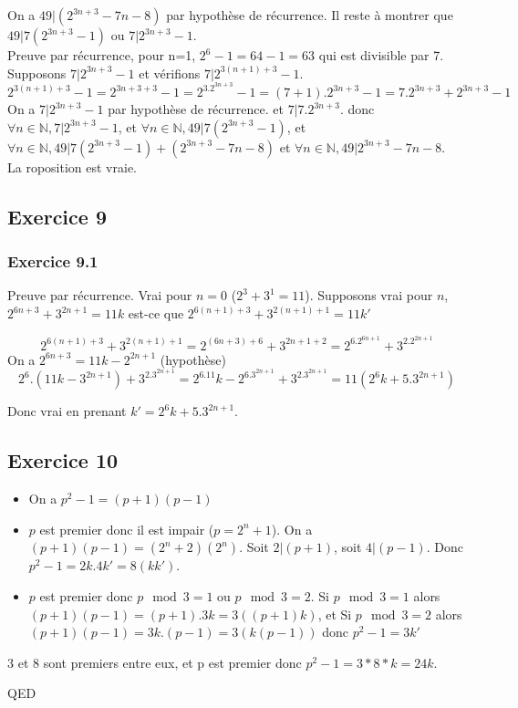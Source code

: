 \documentclass[]{book}
\theoremstyle{definition}
\newcommand{\bb}[1]{\mathbb{#1}}
\newcommand{\N}{\bb{N}}
\begin{document}
On a $49|(2^{3n+3}-7n-8)$ par hypoth\`ese de r\'ecurrence. Il reste \`a montrer que $49|7(2^{3n+3}-1)$ ou $7|2^{3n+3}-1$. \\

Preuve par r\'ecurrence, pour n=1, $2^6-1=64-1=63$ qui est divisible par 7. Supposons $7|2^{3n+3}-1$ et v\'erifions $7|2^{3(n+1)+3}-1$.
$$2^{3(n+1)+3}-1 = 2^{3n+3+3}-1 = 2^3.2^{3n+3}-1 = (7+1).2^{3n+3}-1 = 7.2^{3n+3} + 2^{3n+3}-1$$
On a $7|2^{3n+3}-1$ par hypoth\`ese de r\'ecurrence. et $7|7.2^{3n+3}$. donc $\forall n \in \N, 7| 2^{3n+3}-1$, et $\forall n \in \N, 49|7(2^{3n+3}-1)$, et $\forall n \in \N, 49| 7(2^{3n+3}-1) + (2^{3n+3}-7n-8)$ et $\forall n \in \N, 49| 2^{3n+3}-7n-8$.\\

La roposition est vraie.


\subsection*{Exercice 9}
\subsubsection*{Exercice 9.1}
Preuve par r\'ecurrence. Vrai pour $n=0$ ($2^3+3^1=11$). Supposons vrai pour $n$, $2^{6n+3}+3^{2n+1} = 11k$ est-ce que $2^{6(n+1)+3}+3^{2(n+1)+1} = 11k'$

$$2^{6(n+1)+3}+3^{2(n+1)+1} = 2^{(6n+3)+6}+3^{2n+1+2} = 2^6.2^{6n+1}+3^2.2^{2n+1}$$
On a $2^{6n+3} = 11k - 2^{2n+1}$ (hypoth\`ese)
$$2^6.(11k - 3^{2n+1}) + 3^2.3^{2n+1} = 2^6.11k - 2^6.3^{2n+1} + 3^2.3^{2n+1} = 11(2^6k+5.3^{2n+1})$$

Donc vrai en prenant $k' = 2^6k+5.3^{2n+1}$.


\subsection*{Exercice 10}
\begin{itemize}
\item On a $p^2-1 = (p+1)(p-1)$
\item $p$ est premier donc il est impair ($p=2^n+1$). On a $(p+1)(p-1) = (2^n+2)(2^n)$. Soit $2|(p+1)$, soit $4|(p-1)$. Donc $p^2-1=2k.4k' = 8(kk')$.
\item $p$ est premier donc $p \mod 3 =1$ ou $p \mod 3 =2$. Si $p \mod 3 =1$  alors $(p+1)(p-1) = (p+1).3k = 3((p+1)k)$, et Si $p \mod 3 =2$  alors $(p+1)(p-1) = 3k.(p-1) = 3(k(p-1))$ donc $p^2-1 = 3k'$
\end{itemize}

3 et 8 sont premiers entre eux, et p est premier donc $p^2-1=3*8*k = 24k$.

QED
\end{document}
